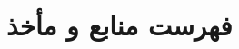 \documentclass[
  a4paper,
  14pt,          %
  twoside,       %
  openright      %
]{extbook}
\begin{document}
\ChapterStart
\chapter*{فهرست منابع و مأخذ}
{}
\begin{latin}
\small
\begin{sloppypar}
\printbibliography[heading=none]
\end{sloppypar}
\end{latin}

%

% 
% 

\backmatter







\thispagestyle{empty}
\null
\clearpage


\end{document}
